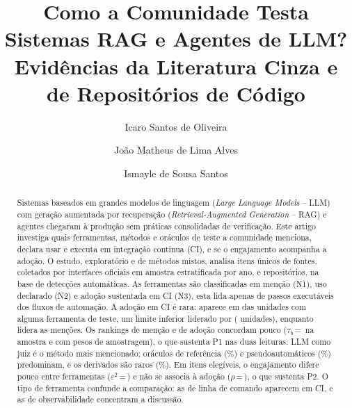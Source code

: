 \documentclass[sigconf]{acmart}
\newcommand{\val}[2]{#1\,=\,#2}
\begin{document}
\title{Como a Comunidade Testa Sistemas RAG e Agentes de LLM? Evidências da Literatura Cinza e de Repositórios de Código}

\author{Icaro Santos de Oliveira}

\author{João Matheus de Lima Alves}

\author{Ismayle de Sousa Santos}

\renewcommand{\shortauthors}{Oliveira et al.}
\renewcommand{\shorttitle}{Como a Comunidade Testa Sistemas RAG e Agentes de LLM}

\begin{abstract}
Sistemas baseados em grandes modelos de linguagem (\textit{Large Language Models} -- LLM) com geração aumentada por recuperação (\textit{Retrieval-Augmented Generation} -- RAG) e agentes chegaram à produção sem práticas consolidadas de verificação. Este artigo investiga quais ferramentas, métodos e oráculos de teste a comunidade menciona, declara usar e executa em integração contínua (CI), e se o engajamento acompanha a adoção. O estudo, exploratório e de métodos mistos, analisa \ResItens{} itens únicos de \ResFontes{} fontes, coletados por interfaces oficiais em amostra estratificada por ano, e \ResReposEnriquecidos{} repositórios, na base de detecções automáticas. As ferramentas são classificadas em menção (N1), uso declarado (N2) e adoção sustentada em CI (N3), esta lida apenas de passos executáveis dos fluxos de automação. A adoção em CI é rara: aparece em \ResUnidadesComNTres{} das \ResUnidadesComFerramenta{} unidades com alguma ferramenta de teste, um limite inferior liderado por \ResTopNTres{} (\ResTopNTresN{} unidades), enquanto \ResTopNUm{} lidera as menções. Os rankings de menção e de adoção concordam pouco (\val{$\tau_b$}{\ResTauUmTres} na amostra e \ResTauUmTresPond{} com pesos de amostragem), o que sustenta P1 nas duas leituras. LLM como juiz é o método mais mencionado; oráculos de referência (\ResPctReferencia\%) e pseudoautomáticos (\ResPctPseudo\%) predominam, e os derivados são raros (\ResPctDerivado\%). Em \ResEngItens{} itens elegíveis, o engajamento difere pouco entre ferramentas (\val{$\varepsilon^2$}{\ResKwEps}) e não se associa à adoção (\val{$\rho$}{\ResRho}), o que sustenta P2. O tipo de ferramenta confunde a comparação: as de linha de comando aparecem em CI, e as de observabilidade concentram a discussão.
\end{abstract}
\end{document}
